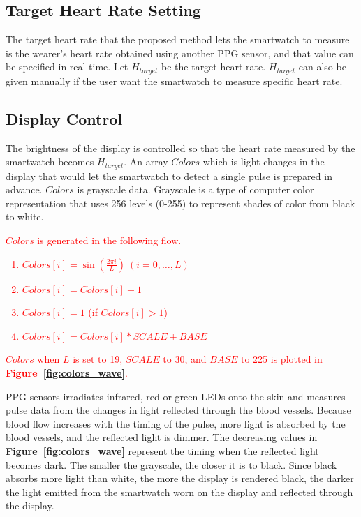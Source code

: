 \documentclass[sigchi,authordraft]{acmart}
\newcommand\figref[1]{\textbf{Figure~\ref{fig:#1}}}
\begin{document}
\subsection{Target Heart Rate Setting}
The target heart rate that the proposed method lets the smartwatch to measure is the wearer's heart rate obtained using another PPG sensor, and that value can be specified in real time. Let $H_{target}$ be the target heart rate. $H_{target}$ can also be given manually if the user want the smartwatch to measure specific heart rate.

\subsection{Display Control}
The brightness of the display is controlled so that the heart rate measured by the smartwatch becomes $H_{target}$. An array $Colors$ which is light changes in the display that would let the smartwatch to detect a single pulse is prepared in advance.
$Colors$ is grayscale data. Grayscale is a type of computer color representation that uses 256 levels (0-255) to represent shades of color from black to white. \textcolor{red}{$Colors$ is generated in the following flow.
\begin{enumerate}
  \renewcommand{\labelenumi}{\arabic{enumi}.}
  \item $Colors[i]=\sin\left(\frac{2\pi i}{L}\right)~(i=0,\dots,L)$
  \item $Colors[i]=Colors[i]+1$
  \item $Colors[i]=1$ (if $Colors[i]>1$)
  \item $Colors[i]=Colors[i]*SCALE+BASE$
\end{enumerate}
$Colors$ when $L$ is set to 19, $SCALE$ to 30, and $BASE$ to 225 is plotted in \figref{colors_wave}.}\par

PPG sensors irradiates infrared, red or green LEDs onto the skin and measures pulse data from the changes in light reflected through the blood vessels. Because blood flow increases with the timing of the pulse, more light is absorbed by the blood vessels, and the reflected light is dimmer. The decreasing values in \figref{colors_wave} represent the timing when the reflected light becomes dark. The smaller the grayscale, the closer it is to black. Since black absorbs more light than white, the more the display is rendered black, the darker the light emitted from the smartwatch worn on the display and reflected through the display.\par
\end{document}
